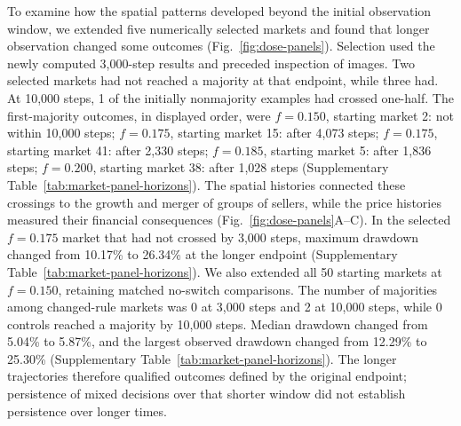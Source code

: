 To examine how the spatial patterns developed beyond the initial
observation window, we extended five numerically selected markets and
found that longer observation changed some outcomes
(Fig.~\ref{fig:dose-panels}). Selection used the newly computed
3,000-step results and preceded inspection of images. Two selected
markets had not reached a majority at that endpoint, while three had.
At 10,000 steps, 1 of the initially nonmajority examples had
crossed one-half. The first-majority outcomes, in displayed order, were
$f=0.150$, starting market 2: not within 10,000 steps; $f=0.175$, starting market 15: after 4{,}073 steps; $f=0.175$, starting market 41: after 2{,}330 steps; $f=0.185$, starting market 5: after 1{,}836 steps; $f=0.200$, starting market 38: after 1{,}028 steps (Supplementary Table~\ref{tab:market-panel-horizons}).
The spatial histories connected these crossings to the growth and
merger of groups of sellers, while the price histories measured their
financial consequences (Fig.~\ref{fig:dose-panels}A--C). In the selected
$f=0.175$ market that had not crossed by 3,000 steps, maximum drawdown
changed from 10.17\% to
26.34\% at the longer endpoint
(Supplementary Table~\ref{tab:market-panel-horizons}).
We also extended all 50 starting markets at $f=0.150$, retaining
matched no-switch comparisons. The number of majorities among changed-rule
markets was 0 at 3,000 steps and
2 at 10,000 steps,
while 0 controls reached a majority by
10,000 steps. Median drawdown changed from
5.04\% to 5.87\%,
and the largest observed drawdown changed from
12.29\% to 25.30\%
(Supplementary Table~\ref{tab:market-panel-horizons}).
The longer trajectories therefore qualified outcomes defined by the
original endpoint; persistence of mixed decisions over that shorter
window did not establish persistence over longer times.

